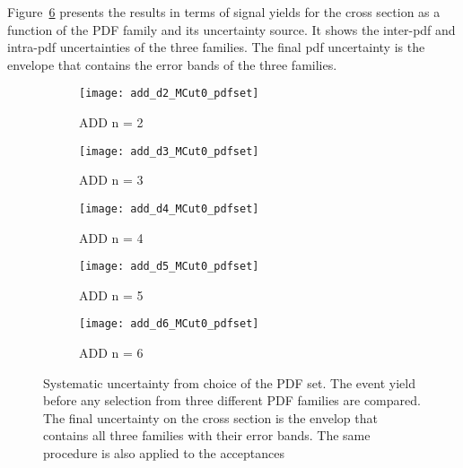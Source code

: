 Figure~\ref{fig:pdf_syst} presents the results in terms of signal yields for the
cross section as a function of the PDF family and its uncertainty source. It
shows the inter-\gls{pdf} and intra-\gls{pdf} uncertainties of the three
families. The final \gls{pdf} uncertainty is the envelope that contains the
error bands of the three families.
\begin{figure}[!h]
  \centering
  \begin{subfigure}{.48\linewidth}
    \texttt{[image: add\_d2\_MCut0\_pdfset]}
    \caption{ADD n = 2}
    \label{fig:}
  \end{subfigure}
  \begin{subfigure}{.48\linewidth}
    \texttt{[image: add\_d3\_MCut0\_pdfset]}
    \caption{ADD n = 3}
    \label{fig:}
  \end{subfigure}
  \begin{subfigure}{.48\linewidth}
    \texttt{[image: add\_d4\_MCut0\_pdfset]}
    \caption{ADD n = 4}
    \label{fig:}
  \end{subfigure}
  \begin{subfigure}{.48\linewidth}
    \texttt{[image: add\_d5\_MCut0\_pdfset]}
    \caption{ADD n = 5}
    \label{fig:}
  \end{subfigure}
  \begin{subfigure}{.48\linewidth}
    \texttt{[image: add\_d6\_MCut0\_pdfset]}
    \caption{ADD n = 6}
    \label{fig:}
  \end{subfigure}
  \caption{Systematic uncertainty from choice of the PDF set. The event yield
    before any selection from three different PDF families are compared. The
    final uncertainty on the cross section is the envelop that contains all
    three families with their error bands. The same procedure is also applied to
    the acceptances}
  \label{fig:pdf_syst}
\end{figure}

